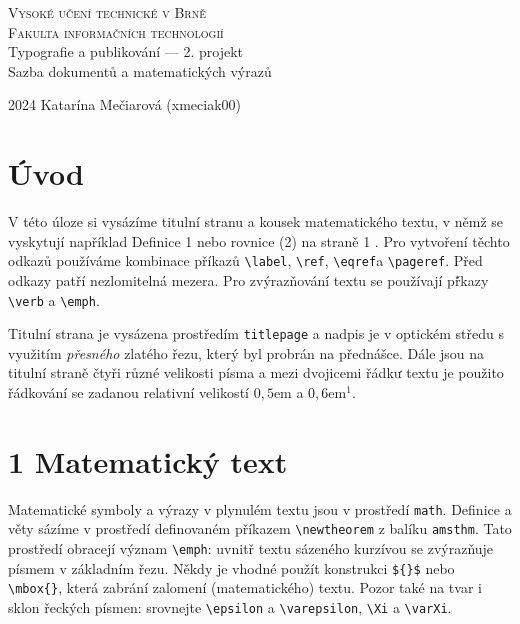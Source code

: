 \documentclass[a4paper, 11pt, twocolumn]{article}[25.2.2024]
\begin{document}
    \begin{titlepage}
        \begin{center}
            \Huge\textsc{Vysoké učení technické v Brně}\\
            \huge\textsc{Fakulta informačních technologií}\\
            {Typografie a publikování –– 2. projekt}\\
                Sazba dokumentů a matematických výrazů\\
        \end{center}
        {\LARGE 2024 \hfill
        Katarína Mečiarová (xmeciak00)}
     
\end{titlepage}



\section*{Úvod}
V této úloze si vysázíme titulní stranu a kousek matematického textu, v němž se vyskytují například Definice 1 nebo rovnice (2) na straně 1 . Pro vytvoření těchto odkazů používáme kombinace příkazů \verb|\label|, \verb|\ref|, \verb|\eqref|a \verb|\pageref|. Před odkazy patří nezlomitelná mezera. Pro zvýrazňování textu se používají př́kazy \verb|\verb| a \verb|\emph|.

Titulní strana je vysázena prostředím \verb|titlepage| a nadpis je v optickém středu s využitím \emph{přesného} zlatého řezu, který byl probrán na přednášce. Dále jsou na titulní straně čtyři různé velikosti písma a mezi dvojicemi řádkư textu je použito řádkování se zadanou relativní velikostí $0,5 \mathrm{em}$ a $0,6 \mathrm{em}^{1}$.

\section*{1 Matematický text}
Matematické symboly a výrazy v plynulém textu jsou v prostředí \verb|math|. Definice a věty sázíme v prostředí definovaném příkazem \verb|\newtheorem| z balíku \verb|amsthm|. Tato prostředí obracejí význam \verb|\emph|: uvnitř textu sázeného kurzívou se zvýrazňuje písmem v základním řezu. Někdy je vhodné použít konstrukci \verb|${}$| nebo \verb|\mbox{}|, která zabrání zalomení (matematického) textu. Pozor také na tvar i sklon řeckých písmen: srovnejte \verb|\epsilon| a \verb|\varepsilon|, \verb|\Xi| a \verb|\varXi|.\\
\end{document}
